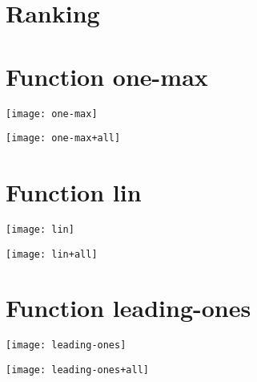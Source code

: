 \graphicspath{{../graphics/}}
\section{Ranking}
\begin{center}

\end{center}

\newpage
\section{Function one-max}
\begin{center}

\end{center}
\begin{center}

\end{center}
\begin{center}
\texttt{[image: one-max]}
\end{center}
\begin{center}
\texttt{[image: one-max+all]}
\end{center}
\newpage
\section{Function lin}
\begin{center}

\end{center}
\begin{center}

\end{center}
\begin{center}
\texttt{[image: lin]}
\end{center}
\begin{center}
\texttt{[image: lin+all]}
\end{center}
\newpage
\section{Function leading-ones}
\begin{center}

\end{center}
\begin{center}

\end{center}
\begin{center}
\texttt{[image: leading-ones]}
\end{center}
\begin{center}
\texttt{[image: leading-ones+all]}
\end{center}
\newpage
